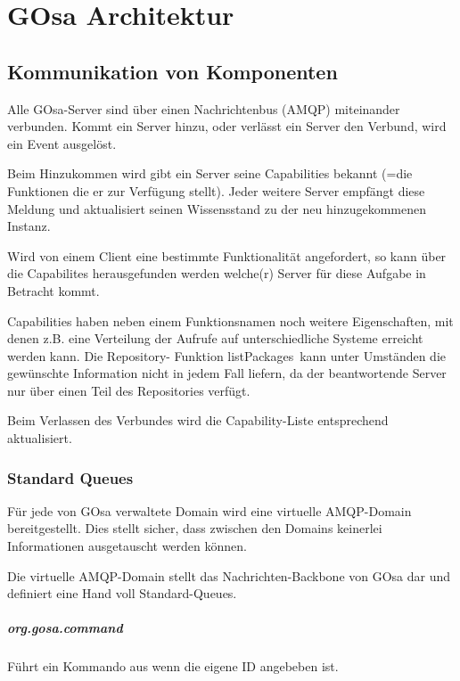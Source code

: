\chapter{GOsa Architektur}

\section{Kommunikation von Komponenten}

Alle GOsa-Server sind über einen Nachrichtenbus (AMQP) miteinander verbunden. Kommt ein Server
hinzu, oder verlässt ein Server den Verbund, wird ein Event ausgelöst.

Beim Hinzukommen wird gibt ein Server seine Capabilities bekannt (=die Funktionen die er
zur Verfügung stellt). Jeder weitere Server empfängt diese Meldung und aktualisiert seinen
Wissensstand zu der neu hinzugekommenen Instanz.

Wird von einem Client eine bestimmte Funktionalität angefordert, so kann über die Capabilites
herausgefunden werden welche(r) Server für diese Aufgabe in Betracht kommt.

Capabilities haben neben einem Funktionsnamen noch weitere Eigenschaften, mit denen z.B. eine
Verteilung der Aufrufe auf unterschiedliche Systeme erreicht werden kann. Die Repository-
Funktion \glqq listPackages\grqq\ kann unter Umständen die gewünschte Information nicht in jedem Fall
liefern, da der beantwortende Server nur über einen Teil des Repositories verfügt.

Beim Verlassen des Verbundes wird die Capability-Liste entsprechend aktualisiert.

\subsection{Standard Queues}

Für jede von GOsa verwaltete Domain wird eine virtuelle AMQP-Domain bereitgestellt. Dies stellt
sicher, dass zwischen den Domains keinerlei Informationen ausgetauscht werden können.

Die virtuelle AMQP-Domain stellt das Nachrichten-Backbone von GOsa dar und definiert
eine Hand voll Standard-Queues.

\paragraph{org.gosa.command}

Führt ein Kommando aus wenn die eigene ID angebeben ist.


